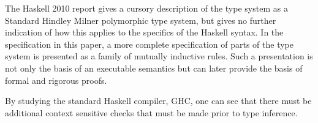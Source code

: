 The Haskell 2010 report gives a cursory description of the type system as a Standard Hindley Milner polymorphic type system, but gives no further indication of how this applies to the specifics of the Haskell syntax. In the specification in this paper, a more complete specification of parts of the type system is presented as a family of mutually inductive rules. Such a presentation is not only the basis of an executable semantics but can later provide the basis of formal and rigorous proofs.

By studying the standard Haskell compiler, GHC, one can see that there must be additional context sensitive checks that must be made prior to type inference.